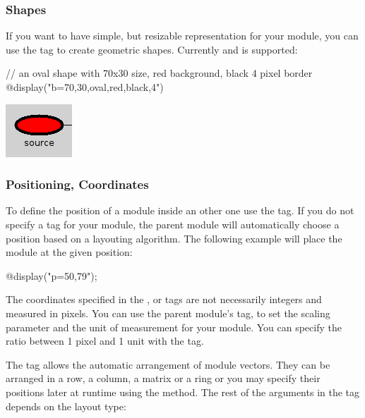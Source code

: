 \subsubsection{Shapes}

If you want to have simple, but resizable representation for your module, you can use
the  tag to create geometric shapes. Currently  and 
is supported:

\begin{ned}
// an oval shape with 70x30 size, red background, black 4 pixel border
@display("b=70,30,oval,red,black,4")
\end{ned}

\begin{center}
\includegraphics{figures/graphics-btag}
\end{center}

\subsubsection{Positioning, Coordinates}

To define the position of a module inside an other one use the  tag.
If you do not specify a  tag for your module, the parent module will
automatically choose a position based on a layouting algorithm.
The following example will place the module at the given position:
\begin{ned}
@display("p=50,79");
\end{ned}

\begin{note}
The coordinates specified in the ,  or  tags are not necessarily
integers and measured in pixels. You can use the parent module's  tag,
to set the scaling parameter and the unit of measurement for your module.
You can specify the ratio between 1 pixel and 1 unit with the  tag.
\end{note}

The  tag allows the automatic arrangement of module vectors. They can be
arranged in a row, a column, a matrix or a ring or you may specify their positions
later at runtime using the  method. The rest of the arguments
in the  tag depends on the layout type:

